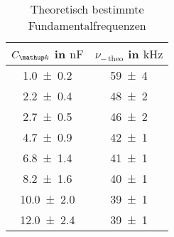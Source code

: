 \begin{table}
\centering
\caption{Theoretisch bestimmte Fundamentalfrequenzen}
\label{tab:teilb_frequenzen_theo}
\begin{tabular}{S S }
\toprule
{$C\ua{k}$ in $\si{\nano\farad}$} &{$\nu_{-\,\mathup{theo}}$ in $\si{\kilo\hertz}$}  \\
\midrule
 \num{1.0\pm0.2} & \num{59\pm4}\\
\num{2.2\pm0.4} & \num{48\pm2}\\
\num{2.7\pm0.5} & \num{46\pm2}\\
\num{4.7\pm0.9} & \num{42\pm1}\\
\num{6.8\pm1.4} & \num{41\pm1}\\
\num{8.2\pm1.6} & \num{40\pm1}\\
\num{10.0\pm2.0} & \num{39\pm1}\\
\num{12.0\pm2.4} & \num{39\pm1}\\
\bottomrule
\end{tabular}
\end{table}

